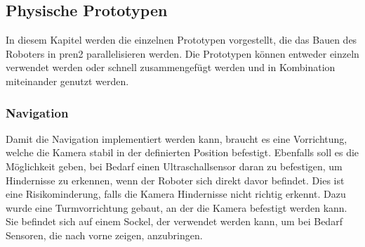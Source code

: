 
\subsection*{Physische Prototypen}\label{prototyp-products}

In diesem Kapitel werden die einzelnen Prototypen vorgestellt, die das Bauen des Roboters in \acrshort{pren2} parallelisieren werden. Die Prototypen können entweder einzeln verwendet werden oder schnell zusammengefügt werden und in Kombination miteinander genutzt werden.

\subsubsection*{Navigation}


Damit die Navigation implementiert werden kann, braucht es eine Vorrichtung, welche die Kamera stabil in der definierten Position befestigt. Ebenfalls soll es die Möglichkeit geben, bei Bedarf einen Ultraschallsensor daran zu befestigen, um Hindernisse zu erkennen, wenn der Roboter sich direkt davor befindet. Dies ist eine Risikominderung, falls die Kamera Hindernisse nicht richtig erkennt. Dazu wurde eine Turmvorrichtung gebaut, an der die Kamera befestigt werden kann. Sie befindet sich auf einem Sockel, der verwendet werden kann, um bei Bedarf Sensoren, die nach vorne zeigen, anzubringen.

